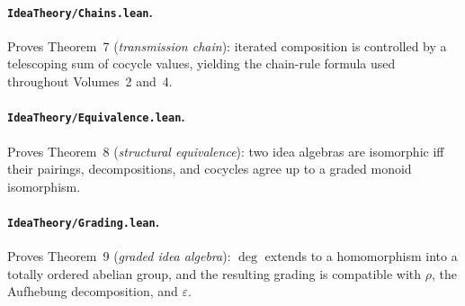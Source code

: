 \documentclass[11pt,oneside]{book}
\begin{document}
\paragraph{\texttt{IdeaTheory/Chains.lean}.}
Proves Theorem~7 (\emph{transmission chain}): iterated composition is
controlled by a telescoping sum of cocycle values, yielding the
chain-rule formula used throughout Volumes~2 and~4.

\paragraph{\texttt{IdeaTheory/Equivalence.lean}.}
Proves Theorem~8 (\emph{structural equivalence}): two idea algebras
are isomorphic iff their pairings, decompositions, and cocycles agree
up to a graded monoid isomorphism.

\paragraph{\texttt{IdeaTheory/Grading.lean}.}
Proves Theorem~9 (\emph{graded idea algebra}): $\deg$ extends to a
homomorphism into a totally ordered abelian group, and the resulting
grading is compatible with $\rho$, the Aufhebung decomposition, and
$\varepsilon$.



\end{document}
